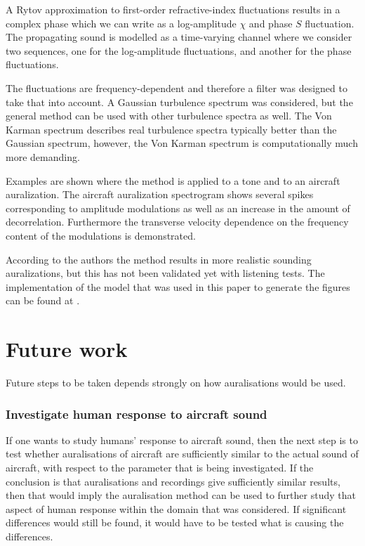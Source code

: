 A Rytov approximation to first-order refractive-index fluctuations results in a complex
phase which we can write as a log-amplitude $\chi$ and phase $S$ fluctuation.
The propagating sound is modelled as a time-varying channel where we consider
two sequences, one for the log-amplitude fluctuations, and another for the phase
fluctuations.

The fluctuations are frequency-dependent and therefore a filter was designed to take that into account.
A Gaussian turbulence spectrum was considered, but the general method can be
used with other turbulence spectra as well. The Von Karman spectrum describes
real turbulence spectra typically better than the Gaussian spectrum, however,
the Von Karman spectrum is computationally much more demanding.

Examples are shown where the method is applied to a tone and to an aircraft
auralization. The aircraft auralization spectrogram shows several spikes
corresponding to amplitude modulations as well as an increase in the amount of
decorrelation. Furthermore the transverse velocity dependence on the frequency
content of the modulations is demonstrated.

According to the authors the method results in more realistic sounding
auralizations, but this has not been validated yet with listening tests. The
implementation of the model that was used in this paper to generate the figures
can be found at \cite{Rietdijk2016}.

\section{Future work}
Future steps to be taken depends strongly on how auralisations would
be used.

\subsubsection*{Investigate human response to aircraft sound}
If one wants to study humans' response to aircraft sound, then the next step is
to test whether auralisations of aircraft are sufficiently similar to the actual
sound of aircraft, with respect to the parameter that is being investigated. If
the conclusion is that auralisations and recordings give sufficiently similar
results, then that would imply the auralisation method can be used to further
study that aspect of human response within the domain that was considered. If
significant differences would still be found, it would have to be tested what is
causing the differences.

